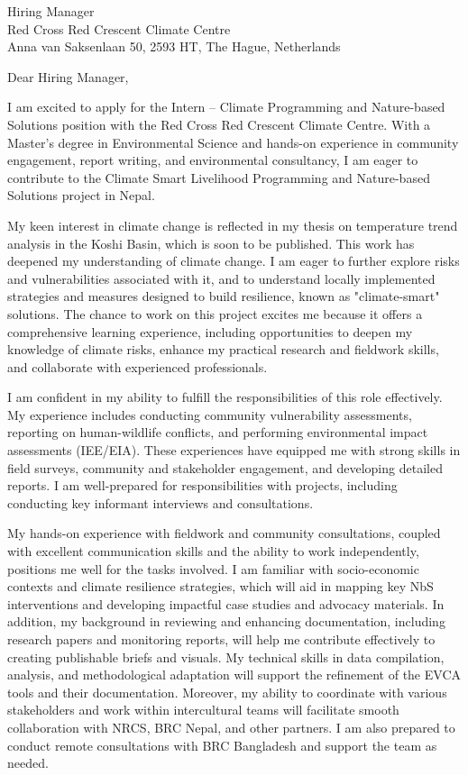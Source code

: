 \documentclass[a4paper,12pt]{letter}
\date{\today}
\begin{document}
\begin{letter}{Hiring Manager\\Red Cross Red Crescent Climate Centre\\Anna van Saksenlaan 50, 2593 HT, The Hague, Netherlands}

\opening{Dear Hiring Manager,}

I am excited to apply for the Intern – Climate Programming and Nature-based Solutions position with the Red Cross Red Crescent Climate Centre. With a Master’s degree in Environmental Science and hands-on experience in community engagement, report writing, and environmental consultancy, I am eager to contribute to the Climate Smart Livelihood Programming and Nature-based Solutions project in Nepal.

My keen interest in climate change is reflected in my thesis on temperature trend analysis in the Koshi Basin, which is soon to be published. This work has deepened my understanding of climate change. I am eager to further explore risks and vulnerabilities associated with it, and to understand locally implemented strategies and measures designed to build resilience, known as "climate-smart" solutions. The chance to work on this project excites me because it offers a comprehensive learning experience, including opportunities to deepen my knowledge of climate risks, enhance my practical research and fieldwork skills, and collaborate with experienced professionals.

I am confident in my ability to fulfill the responsibilities of this role effectively. My experience includes conducting community vulnerability assessments, reporting on human-wildlife conflicts, and performing environmental impact assessments (IEE/EIA). These experiences have equipped me with strong skills in field surveys, community and stakeholder engagement, and developing detailed reports. I am well-prepared for responsibilities with projects, including conducting key informant interviews and consultations.

My hands-on experience with fieldwork and community consultations, coupled with excellent communication skills and the ability to work independently, positions me well for the tasks involved. I am familiar with socio-economic contexts and climate resilience strategies, which will aid in mapping key NbS interventions and developing impactful case studies and advocacy materials. In addition, my background in reviewing and enhancing documentation, including research papers and monitoring reports, will help me contribute effectively to creating publishable briefs and visuals. My technical skills in data compilation, analysis, and methodological adaptation will support the refinement of the EVCA tools and their documentation. Moreover, my ability to coordinate with various stakeholders and work within intercultural teams will facilitate smooth collaboration with NRCS, BRC Nepal, and other partners. I am also prepared to conduct remote consultations with BRC Bangladesh and support the team as needed.


\end{letter}
\end{document}
